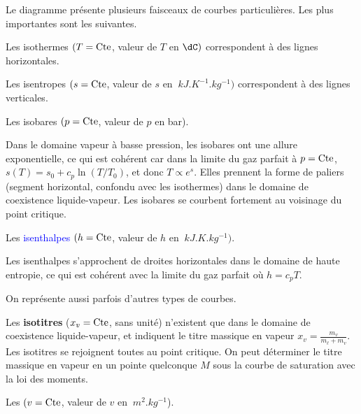\documentclass[12pt,fancy]{cours}
\begin{document}
 Le diagramme présente plusieurs faisceaux de courbes particulières. Les plus importantes sont les suivantes.
\begin{liste}
\item Les isothermes $(T=\text{Cte}$, valeur de $T$ en $\SI{}{\dC})$ correspondent à des lignes horizontales.
\item Les isentropes $(s=\text{Cte}$, valeur de $s$ en $\SI{}{kJ.K^{-1}.kg^{-1}})$ correspondent à des lignes verticales.
\item  Les \textcolor{JoliRouge}{isobares}  $(p=\text{Cte}$, valeur de $p$ en bar).
\begin{remarque}
  Dans le domaine vapeur à basse pression, les isobares ont une allure exponentielle, ce qui est cohérent car dans la limite du gaz parfait à $p=\text{Cte}$, $s(T) = s_0 + c_p \ln(T/T_0)$, et donc $T \propto e^{s}$. Elles
  prennent la forme de paliers (segment horizontal, confondu avec les isothermes) dans le domaine de coexistence liquide-vapeur. Les isobares se courbent fortement au voisinage du point critique.
\end{remarque}

\item  Les \textcolor{blue}{isenthalpes} $(h=\text{Cte}$, valeur de $h$ en $\SI{}{kJ.K.kg^{-1}})$.
\begin{remarque}
  Les isenthalpes s’approchent  de droites
  horizontales dans le domaine de haute entropie, ce qui est cohérent avec la limite du gaz parfait où $h=c_p T$.
\end{remarque}
\end{liste}

On représente aussi parfois d'autres types de courbes.
\begin{liste}
\item Les \textbf{isotitres} ($x_v=\text{Cte}$, sans unité) n’existent que dans le domaine de coexistence liquide-vapeur, et indiquent le titre massique en vapeur $x_v = \frac{m_v}{m_\ell + m_v}$. Les isotitres se rejoignent toutes au point critique. On peut déterminer le titre massique en vapeur en un pointe quelconque $M$ sous la courbe de saturation avec la loi des moments.
\item Les  $(v=\text{Cte}$, valeur de $v$ en $\SI{}{m^2.kg^{-1}}$).
\end{liste}
\end{document}
